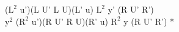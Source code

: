 ($\text{L}^2$ u')(L U' L U)(L' u) $\text{L}^2$ y' (R U' R')\\
$\text{y}^2$ ($\text{R}^2$ u')(R U' R U)(R' u) $\text{R}^2$ y (R U' R') *\\

